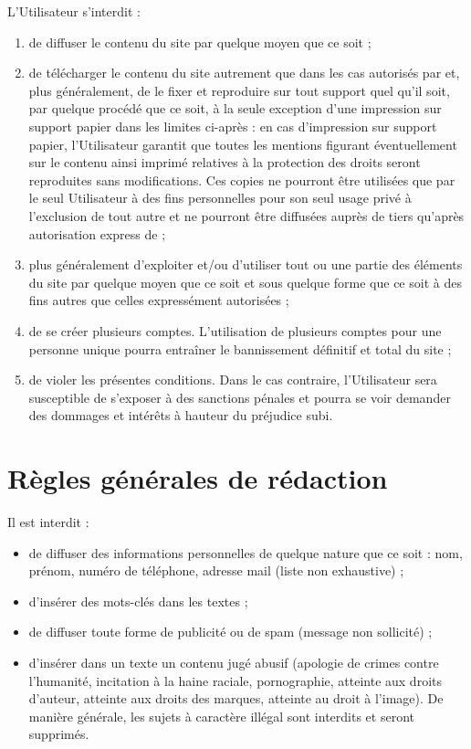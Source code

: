 L'Utilisateur s'interdit :
\begin{enumerate}
   \item de diffuser le contenu du site par quelque moyen que ce soit ;
   \item de télécharger le contenu du site autrement que dans les cas autorisés par \eDevoir et, plus généralement, de le fixer et reproduire sur tout support quel qu'il soit, par quelque procédé que ce soit, à la seule exception d'une impression sur support papier dans les limites ci-après : en cas d'impression sur support papier, l'Utilisateur garantit que toutes les mentions figurant éventuellement sur le contenu ainsi imprimé relatives à la protection des droits seront reproduites sans modifications. Ces copies ne pourront être utilisées que par le seul Utilisateur à des fins personnelles pour son seul usage privé à l'exclusion de tout autre et ne pourront être diffusées auprès de tiers qu'après autorisation express	 de \eDevoir ;
   \item plus généralement d'exploiter et/ou d'utiliser tout ou une partie des éléments du site par quelque moyen que ce soit et sous quelque forme que ce soit à des fins autres que celles expressément autorisées ;
   \item de se créer plusieurs comptes. L'utilisation de plusieurs comptes pour une personne unique pourra entraîner le bannissement définitif et total du site ;
   \item de violer les présentes conditions. Dans le cas contraire, l'Utilisateur sera susceptible de s'exposer à des sanctions pénales et pourra se voir demander des dommages et intérêts à hauteur du préjudice subi.
\end{enumerate}


\section{Règles générales de rédaction}

Il est interdit :
\begin{itemize}
  \item de diffuser des informations personnelles de quelque nature que ce soit : nom, prénom, numéro de téléphone, adresse mail (liste non exhaustive) ;
  \item d'insérer des mots-clés dans les textes ;
  \item de diffuser toute forme de publicité ou de spam (message non sollicité) ;
  \item d'insérer dans un texte un contenu jugé abusif (apologie de crimes contre l'humanité, incitation à la haine raciale, pornographie, atteinte aux droits d'auteur, atteinte aux droits des marques, atteinte au droit à l'image). De manière générale, les sujets à caractère illégal sont interdits et seront supprimés.
\end{itemize}

